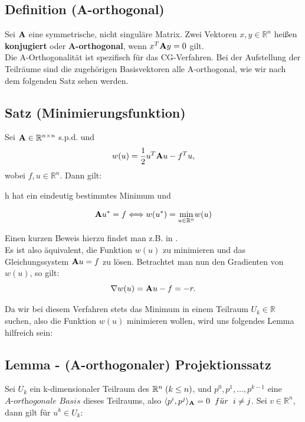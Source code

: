 \subsection{Definition (A-orthogonal)}\label{ss.A-orthogonal}
Sei ${\textbf{A}}$ eine symmetrische, nicht singuläre Matrix. Zwei Vektoren $x,y \in \mathbb{R}^{n}$ heißen \textbf{konjugiert} oder \textbf{A-orthogonal}, wenn $x^{T}{\textbf{A}}y = 0$ gilt.\\

Die A-Orthogonalität ist spezifisch für das CG-Verfahren. Bei der Aufstellung der Teilräume sind die zugehörigen Basisvektoren alle A-orthogonal, wie wir nach dem folgenden Satz sehen werden.

\subsection{Satz (Minimierungsfunktion)}
Sei ${\textbf{A}}\in\mathbb{R}^{n \times n}$ s.p.d. und
\begin{equation}
w(u) = \frac {1} {2} u^{T}{\textbf{A}}u - f^{T}u,
\end{equation}
wobei $f,u \in \mathbb{R}^{n}$. Dann gilt:
\begin{center}
h hat ein eindeutig bestimmtes Minimum und
\end{center}
\begin{equation}
{\textbf{A}}u^{*} = f \Longleftrightarrow w(u^{*}) = \underset{u\in\mathbb{R}^{n}}{\min} w(u)
\end{equation}

Einen kurzen Beweis hierzu findet man z.B. in \cite[S. 566]{DR08}.\\
Es ist also äquivalent, die Funktion $w(u)$ zu minimieren und das Gleichungssystem ${\textbf{A}}u = f$ zu lösen. Betrachtet man nun den Gradienten von $w(u)$, so gilt:
\begin{equation}
\nabla w(u) = {\textbf{A}}u - f = -r.
\end{equation}

Da wir bei diesem Verfahren stets das Minimum in einem Teilraum $U_{k} \in \mathbb{R}$ suchen, also die Funktion $w(u)$ minimieren wollen, wird uns folgendes Lemma hilfreich sein:

\subsection{Lemma - (A-orthogonaler) Projektionssatz}\label{s.Projektionssatz}

Sei $U_{k}$ ein k-dimensionaler Teilraum des $\mathbb{R}^{n} \hspace{1mm} (k \le n)$, und $p^{0}, p^{1},...,p^{k-1}$ eine $\textit{A-orthogonale Basis}$ dieses Teilraums, also $\langle p^{i}, p^{j} \rangle _{{\textbf{A}}} = 0 \hspace{2mm} f\ddot{u}r \hspace{2mm} i \ne j$. Sei $v \in \mathbb{R}^{n}$, dann gilt für $u^{k} \in U_{k}$:

